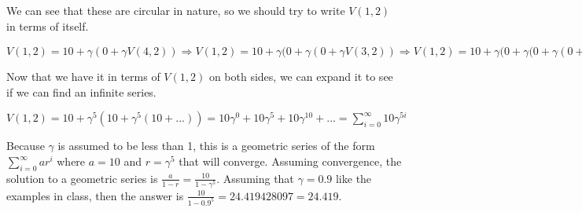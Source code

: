 \documentclass[12pt]{article}
\begin{document}
We can see that these are circular in nature, so we should try to write $V(1, 2)$ in terms of itself.

$V(1, 2) = 10 + \gamma(0 + \gamma V(4, 2)) \Rightarrow V(1, 2) = 10 + \gamma(0 + \gamma(0 + \gamma V(3, 2)) \Rightarrow V(1, 2) = 10 + \gamma(0 + \gamma(0 + \gamma (0 + \gamma V(2, 2)) \Rightarrow V(1, 2) = 10 + \gamma(0 + \gamma(0 + \gamma (0 + \gamma (0 + \gamma V(1, 2)) = 10 + \gamma^5 V(1, 2)$

Now that we have it in terms of $V(1, 2)$ on both sides, we can expand it to see if we can find an infinite series.

$V(1, 2) = 10 + \gamma^5(10 + \gamma^5(10 + ...)) = 10\gamma^0 + 10\gamma^5 + 10\gamma^{10} + ... = \sum_{i=0}^\infty 10\gamma^{5i}$

Because $\gamma$ is assumed to be less than 1, this is a geometric series of the form $\sum_{i=0}^\infty ar^i$ where $a = 10$ and $r = \gamma^5$ that will converge. Assuming convergence, the solution to a geometric series is $\frac{a}{1-r} = \frac{10}{1-\gamma^5}$. Assuming that $\gamma = 0.9$ like the examples in class, then the answer is $\frac{10}{1 - 0.9^5} = 24.419428097 = 24.419$.



\end{document}
